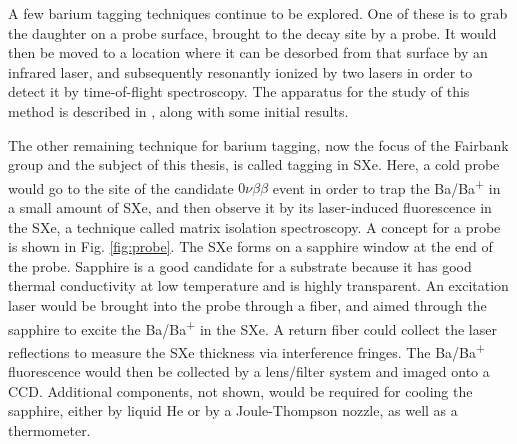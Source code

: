 
A few barium tagging techniques continue to be explored.  One of these is to grab the daughter on a probe surface, brought to the decay site by a probe.  It would then be moved to a location where it can be desorbed from that surface by an infrared laser, and subsequently resonantly ionized by two lasers in order to detect it by time-of-flight spectroscopy.  The apparatus for the study of this method is described in \cite{Twelker2014}, along with some initial results.

The other remaining technique for barium tagging, now the focus of the Fairbank group and the subject of this thesis, is called tagging in SXe.  Here, a cold probe would go to the site of the candidate $0\nu\beta\beta$ event in order to trap the Ba/Ba\textsuperscript{+} in a small amount of SXe, and then observe it by its laser-induced fluorescence in the SXe, a technique called matrix isolation spectroscopy.  A concept for a probe is shown in Fig. \ref{fig:probe}.  The SXe forms on a sapphire window at the end of the probe.  Sapphire is a good candidate for a substrate because it has good thermal conductivity at low temperature and is highly transparent.  An excitation laser would be brought into the probe through a fiber, and aimed through the sapphire to excite the Ba/Ba\textsuperscript{+} in the SXe.  A return fiber could collect the laser reflections to measure the SXe thickness via interference fringes.  The Ba/Ba\textsuperscript{+} fluorescence would then be collected by a lens/filter system and imaged onto a CCD.  Additional components, not shown, would be required for cooling the sapphire, either by liquid He or by a Joule-Thompson nozzle, as well as a thermometer.


